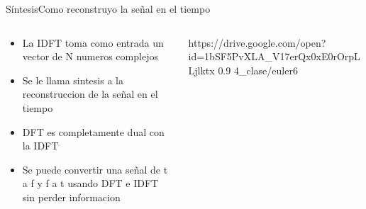 \begin{frame}{Síntesis}{Como reconstruyo la señal en el tiempo}
   \handsonicon
   \footnotesize
   \begin{columns}[c]
      \hspace{2pt}
      \begin{column}{.4\textwidth}
         \begin{itemize}
            \item{La IDFT toma como entrada un vector de N numeros complejos}
            \item{Se le llama sintesis a la reconstruccion de la señal en el tiempo}
            \item{DFT es completamente dual con la IDFT}
            \item{Se puede convertir una señal de t a f y f a t usando DFT e IDFT sin perder informacion}
         \end{itemize}
      \end{column}
      \hspace{2pt}
      \vrule
      \hspace{2pt}
      \begin{column}{.6\textwidth}
         {https://drive.google.com/open?id=1bSF5PvXLA_V17erQx0xE0rOrpLLjlktx}
         {0.9}
         {4_clase/euler6}
      \end{column}
      \hspace{2pt}
   \end{columns}
   \vfill
\end{frame}
